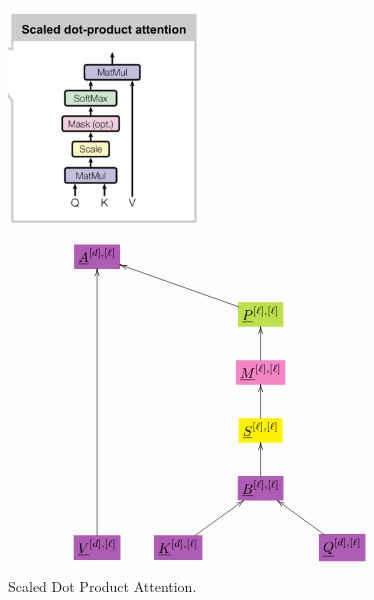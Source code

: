 \documentclass[12pt]{article}
\begin{document}
\begin{figure}[h!]\centering
\begin{minipage}{.5\linewidth}
\includegraphics[width=2in]{scaled-dot-prod-att.jpg}
\end{minipage}%
\begin{minipage}{.5\linewidth}
$$\xymatrix{
*+[F*:Orchid]{\underline{A}^{[d], [\ell]}}&&&
\\
&&*+[F*:SpringGreen]{\underline{P}^{[\ell], [\ell]}}\ar[ull]&
\\
&&*+[F*:Lavender]{\underline{M}^{[\ell], [\ell]}}\ar[u]&
\\
&&*+[F*:yellow]{\underline{S}^{[\ell],[\ell]}}\ar[u]&
\\
&&*+[F*:Orchid]{\underline{B}^{[\ell], [\ell]}}\ar[u]&
\\
*+[F*:Orchid]{\underline{V}^{[d],[\ell]}}\ar[uuuuu]&*+[F*:Orchid]{\underline{K}^{[d],[\ell]}}\ar[ur]&&*+[F*:Orchid]{\underline{Q}^{[d],[\ell]}}\ar[ul]
}$$
\end{minipage}
\caption{Scaled Dot Product Attention.}
\label{fig-texnn-for-scaled-dot-prod-att}
\end{figure}
\end{document}
